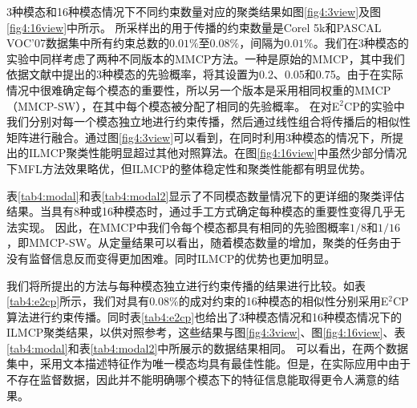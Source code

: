 3种模态和16种模态情况下不同约束数量对应的聚类结果如图\ref{fig4:3view}及图\ref{fig4:16view}中所示。
所采样出的用于传播的约束数量是Corel 5k和PASCAL VOC'07数据集中所有约束总数的$0.01\%$至$0.08\%$，间隔为$0.01\%$。我们在3种模态的实验中同样考虑了两种不同版本的MMCP方法。一种是原始的MMCP，其中我们依据文献\parencite{fu2011multi}中提出的3种模态的先验概率，将其设置为0.2、0.05和0.75。由于在实际情况中很难确定每个模态的重要性，所以另一个版本是采用相同权重的MMCP（MMCP-SW），在其中每个模态被分配了相同的先验概率。
在对E$^2$CP的实验中我们分别对每一个模态独立地进行约束传播，然后通过线性组合将传播后的相似性矩阵进行融合。通过图\ref{fig4:3view}可以看到，在同时利用3种模态的情况下，所提出的ILMCP聚类性能明显超过其他对照算法。在图\ref{fig4:16view}中虽然少部分情况下MFL方法效果略优，但ILMCP的整体稳定性和聚类性能都有明显优势。

表\ref{tab4:modal}和表\ref{tab4:modal2}显示了不同模态数量情况下的更详细的聚类评估结果。当具有8种或16种模态时，通过手工方式确定每种模态的重要性变得几乎无法实现。 因此，在MMCP中我们令每个模态都具有相同的先验图概率$1/8$和$1/16$，即MMCP-SW。从定量结果可以看出，随着模态数量的增加，聚类的任务由于没有监督信息反而变得更加困难。同时ILMCP的优势也更加明显。

我们将所提出的方法与每种模态独立进行约束传播的结果进行比较。如表\ref{tab4:e2cp}所示，我们对具有$0.08\%$的成对约束的16种模态的相似性分别采用E$^2$CP算法进行约束传播。同时表\ref{tab4:e2cp}也给出了3种模态情况和16种模态情况下的ILMCP聚类结果，以供对照参考，这些结果与图\ref{fig4:3view}、图\ref{fig4:16view}、表\ref{tab4:modal}和表\ref{tab4:modal2}中所展示的数据结果相同。
可以看出，在两个数据集中，采用文本描述特征作为唯一模态均具有最佳性能。但是，在实际应用中由于不存在监督数据，因此并不能明确哪个模态下的特征信息能取得更令人满意的结果。

